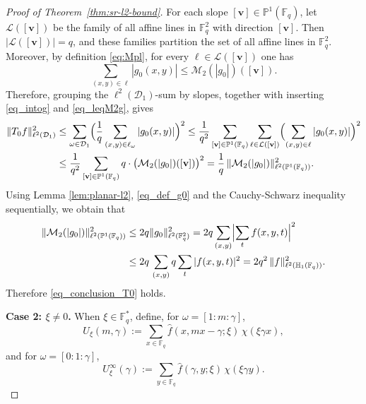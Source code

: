 \documentclass[11pt]{article}
\newcommand{\1}{\mathbf 1}
\begin{document}
\begin{proof}[Proof of Theorem~\ref{thm:sr-l2-bound}]
For each slope $[\mathbf v]\in \mathbb P^1(\mathbb F_q)$, let $\mathcal L([\mathbf v])$ be the family of all affine
lines in $\mathbb F_q^2$ with direction $[\mathbf v]$. Then $|\mathcal L([\mathbf v])|=q$, and these families
partition the set of all affine lines in $\mathbb F_q^2$. Moreover, by definition \eqref{eq:Mpl}, for every
$\ell\in\mathcal L([\mathbf v])$ one has
\begin{equation} \label{eq_leqM2g}
\sum_{(x,y)\in \ell} |g_0(x,y)| \le \mathcal M_2(|g_0|)([\mathbf v]).
\end{equation}
Therefore, grouping the $\ell^2(\mathcal D_1)$-sum by slopes, together with inserting \eqref{eq_intog} and \eqref{eq_leqM2g}, gives
\begin{align*}
\|T_0 f\|_{\ell^2(\mathcal D_1)}^2& \leq \sum_{\omega\in\mathcal D_1}\Bigl(\frac{1}{q}\sum_{(x,y)\in \ell_\omega} |g_0(x,y)|\Bigr)^2
\le \frac{1}{q^2}\sum_{[\mathbf v]\in\mathbb P^1(\mathbb F_q)}
\sum_{\ell\in\mathcal L([\mathbf v])}\Bigl(\sum_{(x,y)\in \ell} |g_0(x,y)|\Bigr)^2 \nonumber\\
&\le \frac{1}{q^2}\sum_{[\mathbf v]\in\mathbb P^1(\mathbb F_q)} q\cdot
\bigl(\mathcal M_2(|g_0|)([\mathbf v])\bigr)^2 = \frac{1}{q}\,\|\mathcal M_2(|g_0|)\|_{\ell^2(\mathbb P^1(\mathbb F_q))}^2. 
\end{align*}
Using Lemma \ref{lem:planar-l2}, \eqref{eq_def_g0} and the Cauchy-Schwarz inequality sequentially, we obtain that
\begin{align*}
\|\mathcal M_2(|g_0|)\|_{\ell^2(\mathbb P^1(\mathbb F_q))}^2 &\leq 2q \|g_0\|_{\ell^2(\mathbb F_q^2)}^2= 2q\sum\limits_{(x,y)}\Bigl|\sum\limits_t f(x,y,t)\Bigr|^2\\
&\le 2q\, \sum\limits_{(x,y)} q\sum_t |f(x,y,t)|^2=2q^2\,\|f\|_{\ell^2(\mathbb H_1(\mathbb F_q))}^2.
\end{align*}
Therefore \eqref{eq_conclusion_T0} holds.


\noindent\textbf{Case 2: $\xi\neq 0$.} 
When $\xi\in\mathbb F_q^*$, define, for $\omega=[1:m:\gamma]$,
\[
U_\xi(m,\gamma)
:=
\sum_{x\in\mathbb F_q}
\widehat f(x,mx-\gamma;\xi)\,\chi(\xi\gamma x),
\]
and for $\omega=[0:1:\gamma]$,
\[
U_\xi^\infty(\gamma)
:=
\sum_{y\in\mathbb F_q}
\widehat f(\gamma,y;\xi)\,\chi(\xi\gamma y).
\]


\end{proof}
\end{document}
